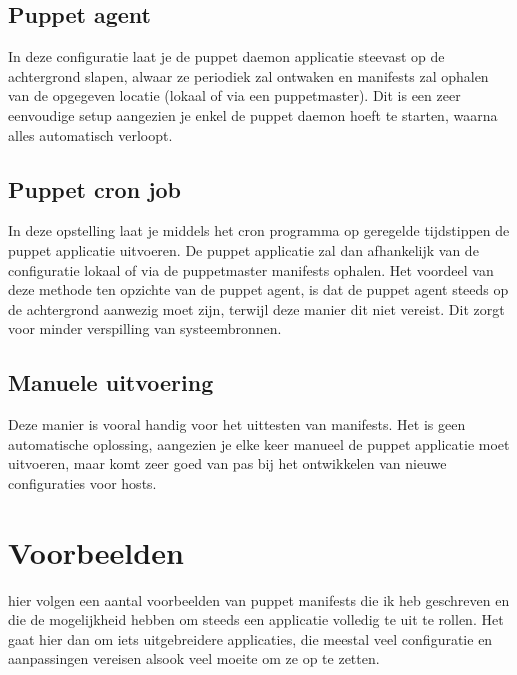\subsection{Puppet agent}
In deze configuratie laat je de puppet daemon applicatie steevast op de achtergrond slapen, alwaar ze periodiek zal ontwaken en manifests zal ophalen van de opgegeven locatie (lokaal of via een puppetmaster). Dit is een zeer eenvoudige setup aangezien je enkel de puppet daemon hoeft te starten, waarna alles automatisch verloopt.
%
\subsection{Puppet cron job}
In deze opstelling laat je middels het cron programma op geregelde tijdstippen de puppet applicatie uitvoeren. De puppet applicatie zal dan afhankelijk van de configuratie lokaal of via de puppetmaster manifests ophalen. Het voordeel van deze methode ten opzichte van de puppet agent, is dat de puppet agent steeds op de achtergrond aanwezig moet zijn, terwijl deze manier dit niet vereist. Dit zorgt voor minder verspilling van systeembronnen.
% 
\subsection{Manuele uitvoering}
Deze manier is vooral handig voor het uittesten van manifests. Het is geen automatische oplossing, aangezien je elke keer manueel de puppet applicatie moet uitvoeren, maar komt zeer goed van pas bij het ontwikkelen van nieuwe configuraties voor hosts.
%
\section{Voorbeelden}
hier volgen een aantal voorbeelden van puppet manifests die ik heb geschreven en die de mogelijkheid hebben om steeds een applicatie volledig te uit te rollen. Het gaat hier dan om iets uitgebreidere applicaties, die meestal veel configuratie en aanpassingen vereisen alsook veel moeite om ze op te zetten.
